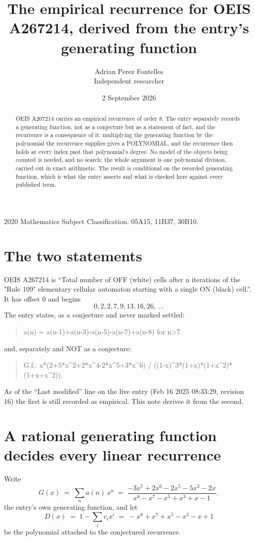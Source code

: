 \documentclass[11pt,a4paper]{article}
\title{The empirical recurrence for OEIS A267214, derived from the entry's generating function}
\author{Adrian Perez Fontelles\\ \small Independent researcher}
\date{2 September 2026}
\theoremstyle{plain}
\theoremstyle{definition}
\begin{document}
\maketitle

\begin{abstract}
OEIS A267214 carries an empirical recurrence of order $8$. The entry separately records a
generating function, not as a conjecture but as a statement of fact, and the recurrence is a
consequence of it: multiplying the generating function by the polynomial the recurrence
supplies gives a POLYNOMIAL, and the recurrence then holds at every index past that
polynomial's degree. No model of the objects being counted is needed, and no search: the
whole argument is one polynomial division, carried out in exact arithmetic. The result is
conditional on the recorded generating function, which is what the entry asserts and what is
checked here against every published term.
\end{abstract}

\noindent\small 2020 Mathematics Subject Classification. 05A15, 11B37, 30B10.\normalsize

\section{The two statements}

OEIS A267214 is ``Total number of OFF (white) cells after n iterations of the "Rule 109" elementary cellular automaton starting with a single ON (black) cell.''. It has offset $0$ and begins
\[
0, 2, 2, 7, 9, 13, 16, 26,\ \dots
\]
The entry states, as a conjecture and never marked settled:
\begin{quote}
a(n) = a(n-1)+a(n-3)-a(n-5)-a(n-7)+a(n-8) for n>7.
\end{quote}
and, separately and NOT as a conjecture:
\begin{quote}
G.f.: x*(2+5*x\^{}2+2*x\^{}4-2*x\^{}5+3*x\^{}6) / ((1-x)\^{}3*(1+x)*(1+x\^{}2)*(1+x+x\^{}2)).
\end{quote}
As of the ``Last modified'' line on the live entry (Feb 16 2025 08:33:29, revision 16) the first is still
recorded as empirical. This note derives it from the second.

\section{A rational generating function decides every linear recurrence}

Write
\[
G(x)\;=\;\sum_{n}a(n)\,x^{n}\;=\;\frac{- 3 x^{7} + 2 x^{6} - 2 x^{5} - 5 x^{3} - 2 x}{x^{8} - x^{7} - x^{5} + x^{3} + x - 1},
\]
the entry's own generating function, and let
\[
D(x)\;=\;1-\sum_i c_i x^{i}\;=\;- x^{8} + x^{7} + x^{5} - x^{3} - x + 1
\]
be the polynomial attached to the conjectured recurrence.
\end{document}
